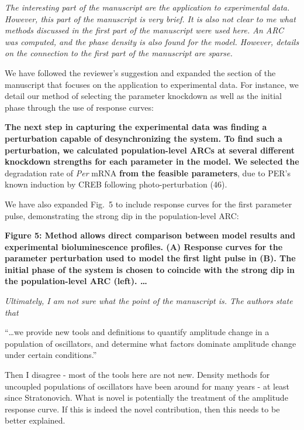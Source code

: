 \documentclass[11pt, letterpaper]{article}
\newenvironment{reviewer}{\itshape\color{gray}}{}
\newenvironment{manuscript}[1]{\begin{center}\begin{tcolorbox}[colback=green!5!white,colframe=green!75!black,width=0.8\textwidth,title={#1},breakable,fonttitle=\bfseries]}{\end{tcolorbox}\end{center}}
\begin{document}
\begin{reviewer}
The interesting part of the manuscript are the application to experimental data.
However, this part of the manuscript is very brief.
It is also not clear to me what methods discussed in the first part of the manuscript were used here.
An ARC was computed, and the phase density is also found for the model.
However, details on the connection to the first part of the manuscript are sparse.
\end{reviewer}

We have followed the reviewer's suggestion and expanded the section of the manuscript that focuses on the application to experimental data.
For instance, we detail our method of selecting the parameter knockdown as well as the initial phase through the use of response curves:

\begin{manuscript}{Page 16}
{\bfseries
The next step in capturing the experimental data was finding a perturbation capable of desynchronizing the system.
To find such a perturbation, we calculated population-level ARCs at several different knockdown strengths for each parameter in the model.
We selected the} degradation rate of {\itshape Per} mRNA {\bfseries from the feasible parameters}, due to PER's known induction by CREB following photo-perturbation (46).
\end{manuscript}

We have also expanded Fig.~5 to include response curves for the first parameter pulse, demonstrating the strong dip in the population-level ARC:

\begin{manuscript}{Page 17}
\bfseries
Figure 5: Method allows direct comparison between model results and experimental bioluminescence profiles.
({\bfseries A}) Response curves for the parameter perturbation used to model the first light pulse in (B).
The initial phase of the system is chosen to coincide with the strong dip in the population-level ARC (left). \dots
\end{manuscript}


\begin{reviewer}
Ultimately, I am not sure what the point of the manuscript is. The authors state that 
 
``\dots we provide new tools and definitions to quantify amplitude change in a population of oscillators, and determine what factors dominate amplitude change under certain conditions.''
 
Then I disagree - most of the tools here are not new.
Density methods for uncoupled populations of oscillators have been around for many years - at least since Stratonovich.
What is novel is potentially the treatment of the amplitude response curve.
If this is indeed the novel contribution, then this needs to be better explained.
\end{reviewer}
\end{document}
